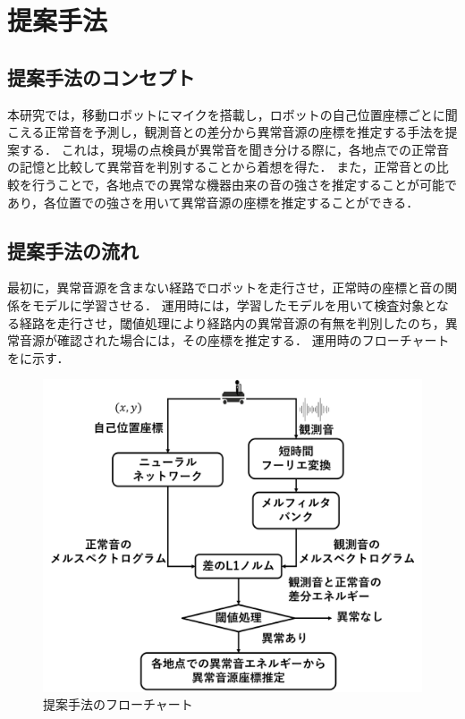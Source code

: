 \documentclass[../main]{subfiles}
\begin{document}
\graphicspath{{../figures/}}

\section{提案手法}


\subsection{提案手法のコンセプト}
本研究では，移動ロボットにマイクを搭載し，ロボットの自己位置座標ごとに聞こえる正常音を予測し，観測音との差分から異常音源の座標を推定する手法を提案する．
これは，現場の点検員が異常音を聞き分ける際に，各地点での正常音の記憶と比較して異常音を判別することから着想を得た．
また，正常音との比較を行うことで，各地点での異常な機器由来の音の強さを推定することが可能であり，各位置での強さを用いて異常音源の座標を推定することができる．

\subsection{提案手法の流れ}
最初に，異常音源を含まない経路でロボットを走行させ，正常時の座標と音の関係をモデルに学習させる．
運用時には，学習したモデルを用いて検査対象となる経路を走行させ，閾値処理により経路内の異常音源の有無を判別したのち，異常音源が確認された場合には，その座標を推定する．
運用時のフローチャートをに示す．
\begin{figure}[tb]
  \centering
  \includegraphics[keepaspectratio, width=1.0\linewidth]{flowchart.pdf}
  \caption{提案手法のフローチャート}
\end{figure}
\end{document}
